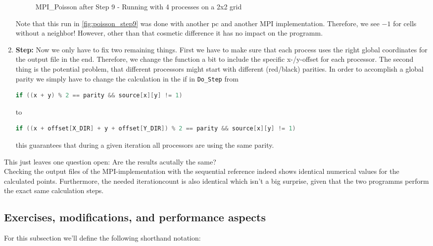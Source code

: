 \begin{enumerate}
\begin{figure}[H]
        \caption{MPI\_Poisson after Step 9 - Running with 4 processes on a 2x2 grid}
        \label{fig:poisson_step9}
    \end{figure}
    Note that this run in \autoref{fig:poisson_step9} was done with another pc and another MPI implementation. Therefore, we see $-1$ for cells without a neighbor! However, other than that cosmetic difference it has no impact on the programm. 
    \item \textbf{Step:} Now we only have to fix two remaining things. First we have to make sure that each process uses the right global coordinates for the output file in the end. Therefore, we change the function a bit to include the specific x-/y-offset for each processor. The second thing is the potential problem, that different processors might start with different (red/black) parities. In order to accomplish a global parity we simply have to change the calculation in the if in \texttt{Do\_Step} from 
    \begin{lstlisting}[language=c, lastline=1]
        if ((x + y) % 2 == parity && source[x][y] != 1)
    \end{lstlisting}
    to
    \begin{lstlisting}[language=c, lastline=1]
        if ((x + offset[X_DIR] + y + offset[Y_DIR]) % 2 == parity && source[x][y] != 1)
    \end{lstlisting}
    this guarantees that during a given iteration all processors are using the same parity. 
\end{enumerate}
This just leaves one question open: Are the results acutally the same?\\
Checking the output files of the MPI-implementation with the sequential reference indeed shows identical numerical values for the calculated points. Furthermore, the needed iterationcount is also identical which isn't a big surprise, given that the two programms perform the exact same calculation steps. 
\subsection{Exercises, modifications, and performance aspects}
For this subsection we'll define the following shorthand notation: \\

